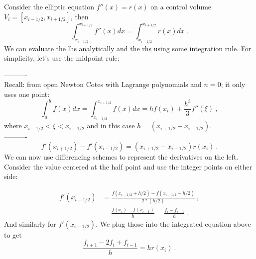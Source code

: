 \documentclass[12pt]{article}
\begin{document}
%
\begin{center}
\end{center}

Consider the elliptic equation $f''(x) = r(x)$ on a control volume $V_i = [x_{i-1/2}, x_{i+1/2}]$, then
\[\int_{x_{i-1/2}}^{x_{i+1/2}} f''(x)dx = \int_{x_{i-1/2}}^{x_{i+1/2}} r(x) dx\:.\]
%
We can evaluate the lhs analytically and the rhs using some integration rule. For simplicity, let's use the midpoint rule:

----------\\
Recall: from open Newton Cotes with Lagrange polynomials and $n=0$; it only uses one point:
\[\int_a^b f(x)dx = \int_{x_{i-1/2}}^{x_{i+1/2}} f(x)dx = hf(x_i) + \frac{h^3}{3}f''(\xi)\:,\]
where $x_{i-1/2} < \xi < x_{i+1/2}$ and in this case $h=(x_{i+1/2}-x_{i-1/2})$.\\
----------
%
\[f'(x_{i+1/2}) - f'(x_{i-1/2}) = (x_{i+1/2} - x_{i-1/2})r(x_i)\:.\]
%
We can now use differencing schemes to represent the derivatives on the left. \\
Consider the value centered at the half point and use the integer points on either side:
%
\begin{center}
\end{center}
%
\begin{align*}
f'(x_{i - 1/2}) &= \frac{f(x_{i - 1/2} + h/2) - f(x_{i - 1/2} - h/2)}{2*(h/2)}\:, \\
&=\frac{f(x_{i}) - f(x_{i - 1})}{h} = \frac{f_i - f_{i - 1}}{h}\:.
\end{align*} 
%
And similarly for $f'(x_{i + 1/2})$. We plug those into the integrated equation above to get
\[\frac{f_{i+1} - 2f_i + f_{i-1}}{h} = hr(x_i)\:.\]
\end{document}
